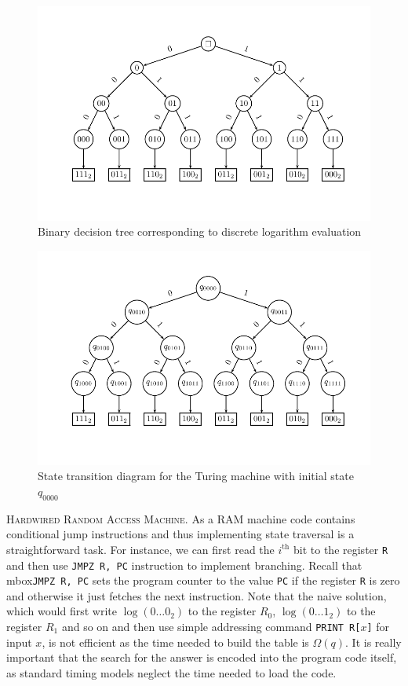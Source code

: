 \documentclass{crypto-exercise}
\begin{document}
\begin{solution}
\begin{figure}
\centerline{\includegraphics[trim=1cm 1cm 1cm 1cm, clip]{figures/input-tree}}
\caption{Binary decision tree corresponding to discrete logarithm evaluation}
\label{fig:binary-tree-traversal}
\end{figure}
\begin{figure}[!h]
\centerline{\includegraphics[trim=1cm 1cm 1cm 1cm, clip]{figures/state-tree}}
\caption{State transition diagram for the Turing machine with initial state $q_{0000}$}
\label{fig:state-diagram}
\end{figure}

\vspace*{2ex}
\noindent\textsc{Hardwired Random Access Machine.}
As a RAM machine code contains conditional jump instructions and thus implementing state traversal is a straightforward task. For instance, we can first read the $i^{\text{th}}$ bit to the register \texttt{R} and then use \mbox{\texttt{JMPZ R, PC}} instruction to implement branching. Recall that mbox{\texttt{JMPZ R, PC}} sets the program counter to the value \texttt{PC} if the register \texttt{R} is zero and otherwise it just fetches the next instruction. Note that the naive solution, which would first write $\log(0\ldots0_2)$ to the register $R_0$, $\log(0\ldots1_2)$ to the register $R_1$ and so on and then use simple addressing command \texttt{PRINT R[$x$]} for input $x$, is not efficient as the time needed to build the table is $\Omega(q)$. It is really important that the search for the answer is encoded into the program code itself, as standard timing models neglect the time needed to load the code.    


\end{solution}
\end{document}
